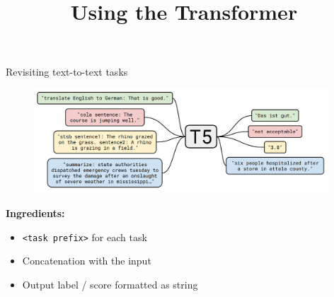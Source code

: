 


\usepackage{movie15}
\usepackage{animate}

\newcommand{\titlefigure}{figure/sesamestreet.jpeg}
\newcommand{\learninggoals}{
\item shortcomings of BERT \& Co.
\item everything as text-to-text
\item Dynamic Masking}

\title{Using the Transformer}
\date{}




\begin{frame}{Revisiting text-to-text tasks}

\vfill
	
	\begin{figure}
		\centering
		\includegraphics[width = 11cm]{figure/62-t5.png}\\ 
	\end{figure}
	
\textbf{Ingredients:}
	
\begin{itemize}
	\item \texttt{<task prefix>} for each task
	\item[] Concatenation with the input
	\item Output label / score formatted as string
\end{itemize}
	
\vfill

\end{frame}


